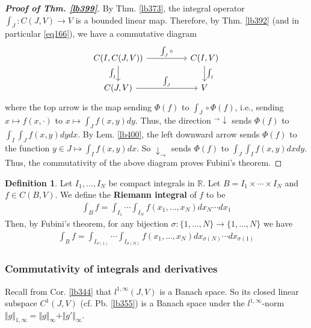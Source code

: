 \documentclass[12pt,b5paper,notitlepage]{article}
\theoremstyle{definition}
\newtheorem{df}{Definition}[section]
\theoremstyle{plain}
\newcommand{\Rbb}{\mathbb R}
\numberwithin{equation}{section}
\begin{document}
\begin{proof}[\textbf{Proof of Thm. \ref{lb399}}]
By Thm. \ref{lb373}, the integral operator $\int_J:C(J,V)\rightarrow V$ is a bounded linear map. Therefore, by Thm. \ref{lb392} (and in particular \eqref{eq166}), we have a commutative diagram
\begin{equation*}
\begin{tikzcd}[column sep=huge]
C(I,C(J,V)) \arrow[r,"\int_J\circ"] \arrow[d,"\int_I"'] & C(I,V) \arrow[d,"\int_I"] \\
C(J,V) \arrow[r,"\int_J"]           & V          
\end{tikzcd} 
\end{equation*}
where the top arrow is the map sending $\Phi(f)$ to $\int_J\circ\Phi(f)$, i.e., sending $x\mapsto f(x,\cdot)$ to $x\mapsto \int_J f(x,y)dy$. Thus, the direction ${}^\rightarrow\!\downarrow$ sends $\Phi(f)$ to $\int_I\int_Jf(x,y)dydx$. By Lem. \ref{lb400}, the left downward arrow sends $\Phi(f)$ to the function $y\in J\mapsto \int_I f(x,y)dx$. So $\downarrow_\rightarrow$ sends $\Phi(f)$ to $\int_J\int_I f(x,y)dxdy$. Thus, the commutativity of the above diagram proves Fubini's theorem.
\end{proof}


\begin{df}
Let $I_1,\dots,I_N$ be compact integrals in $\Rbb$. Let $B=I_1\times\cdots\times I_N$ and $f\in C(B,V)$. We define the \textbf{Riemann integral} of $f$ to be
\begin{align*}
\int_Bf=\int_{I_1}\cdots\int_{I_N}f(x_1,\dots,x_N)dx_N\cdots dx_1
\end{align*}
Then, by Fubini's theorem, for any bijection $\sigma:\{1,\dots,N\}\rightarrow\{1,\dots,N\}$ we have
\begin{align*}
\int_Bf=\int_{I_{\sigma(1)}}\cdots\int_{I_{\sigma(N)}}f(x_1,\dots,x_N)dx_{\sigma(N)}\cdots dx_{\sigma(1)}
\end{align*}
\end{df}


\subsubsection{Commutativity of integrals and derivatives}


Recall from Cor. \ref{lb344} that $l^{1,\infty}(J,V)$ is a Banach space. So its closed linear subspace $C^1(J,V)$ (cf. Pb. \ref{lb355}) is a Banach space under the $l^{1,\infty}$-norm $\Vert g\Vert_{1,\infty}=\Vert g\Vert_\infty+\Vert g'\Vert_\infty$.
\end{document}

